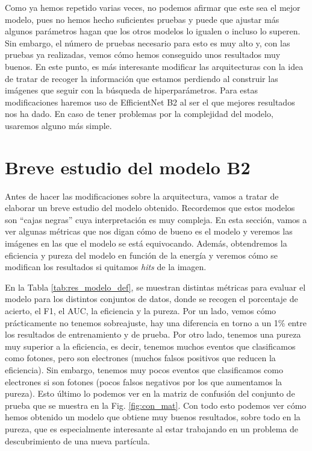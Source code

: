 \documentclass[a4paper,12pt,oneside,titlepage]{book}
\begin{document}
Como ya hemos repetido varias veces, no podemos afirmar que este sea el mejor modelo, pues no hemos hecho suficientes pruebas y puede que ajustar más algunos parámetros hagan que los otros modelos lo igualen o incluso lo superen. Sin embargo, el número de pruebas necesario para esto es muy alto y, con las pruebas ya realizadas, vemos cómo hemos conseguido unos resultados muy buenos. En este punto, es más interesante modificar las arquitecturas con la idea de tratar de recoger la información que estamos perdiendo al construir las imágenes que seguir con la búsqueda de hiperparámetros. Para estas modificaciones haremos uso de EfficientNet B2 al ser el que mejores resultados nos ha dado. En caso de tener problemas por la complejidad del modelo, usaremos alguno más simple.


\section{Breve estudio del modelo B2}
 
Antes de hacer las modificaciones sobre la arquitectura, vamos a tratar de elaborar un breve estudio del modelo obtenido. Recordemos que estos modelos son ``cajas negras'' cuya interpretación es muy compleja. En esta sección, vamos a ver algunas métricas que nos digan cómo de bueno es el modelo y veremos las imágenes en las que el modelo se está equivocando.
Además, obtendremos la eficiencia y pureza del modelo en función de la energía y veremos cómo se modifican los resultados si quitamos \textit{hits} de la imagen.
 
En la Tabla \ref{tab:res_modelo_def}, se muestran distintas métricas para evaluar el modelo para los distintos conjuntos de datos, donde se recogen el porcentaje de acierto, el F1, el AUC, la eficiencia y la pureza. Por un lado, vemos cómo prácticamente no tenemos sobreajuste, hay una diferencia en torno a un 1\% entre los resultados de entrenamiento y de prueba. Por otro lado, tenemos una pureza muy superior a la eficiencia, es decir, tenemos muchos eventos que clasificamos como fotones, pero son electrones (muchos falsos positivos que reducen la eficiencia). Sin embargo, tenemos muy pocos eventos que clasificamos como electrones si son fotones (pocos falsos negativos por los que aumentamos la pureza). Esto último lo podemos ver en la matriz de confusión del conjunto de prueba que se muestra en la Fig. \ref{fig:con_mat}. Con todo esto podemos ver cómo hemos obtenido un modelo que obtiene muy buenos resultados, sobre todo en la pureza, que es especialmente interesante al estar trabajando en un problema de descubrimiento de una nueva partícula.
\end{document}
